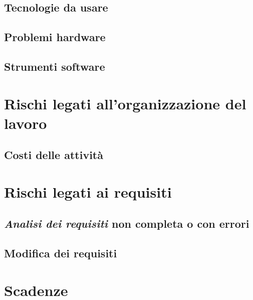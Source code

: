 \documentclass[PianoDiProgetto.tex]{subfiles}
\begin{document}
\subsection{Tecnologie da usare}
\subsection{Problemi hardware}
\subsection{Strumenti software}

\section{Rischi legati all'organizzazione del lavoro}
\subsection{Costi delle attività}

\section{Rischi legati ai requisiti}
\subsection{\textit{Analisi dei requisiti} non completa o con errori}
\subsection{Modifica dei requisiti}

\section{Scadenze}
\end{document}
